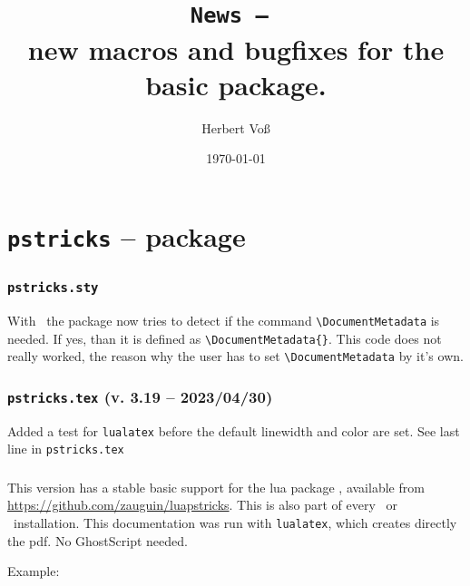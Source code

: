 \documentclass[11pt,english,BCOR=10mm,DIV=12,bibliography=totoc,parskip=false,headings=small,
    headinclude=false,footinclude=false,twoside,usegeometry,dvipsnames]{pst-doc}
\def\Lcs#1{\texttt{\textbackslash#1}}
\begin{document}
\title{\texttt{News -- \the\year}\\ \Large new macros and bugfixes for the basic package.}
\author{Herbert Voß}
\date{\today}

\settitle

\tableofcontents

\part{\texttt{pstricks} -- package}

\section{\texttt{pstricks.sty}}
With \LuaLaTeX\ the package now tries to detect if the command \Lcs{DocumentMetadata} is
needed. If yes, than it is defined as \Verb|\DocumentMetadata{}|. This code does not really
worked, the reason why the user has to set \Lcs{DocumentMetadata} by it's own.


\section{\texttt{pstricks.tex} (v. 3.19 -- 2023/04/30)}

Added a test for \verb|lualatex| before the default linewidth and color are set.
See last line in \verb|pstricks.tex|

\section{\LuaLaTeX}\label{lua}
This version has a stable basic support for the lua package
, available from \url{https://github.com/zauguin/luapstricks}.
This is also part of every \MiKTeX\ or \TeXLive\ installation.  This documentation was
run with \verb|lualatex|, which creates directly the pdf. No GhostScript needed.

Example:
\end{document}
